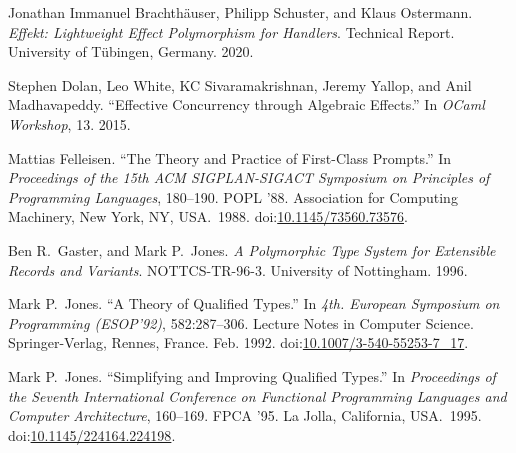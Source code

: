 \documentclass{llncs}
\begin{document}
\newpage{}%

{%
\begin{thebibliography}{20}%

\mdbibitemlabel{{}[1]}Jonathan Immanuel Brachth\"{a}user, Philipp Schuster, and Klaus Ostermann. \emph{Effekt: Lightweight Effect Polymorphism for Handlers}. Technical Report. University of T\"{u}bingen, Germany. 2020.%

\mdbibitemlabel{{}[2]}Stephen Dolan, Leo White, KC Sivaramakrishnan, Jeremy Yallop, and Anil Madhavapeddy. \textquotedblleft{}Effective Concurrency through Algebraic Effects.\textquotedblright{} In \emph{OCaml Workshop}, 13. 2015.%

\mdbibitemlabel{{}[3]}Mattias Felleisen. \textquotedblleft{}The Theory and Practice of First-Class Prompts.\textquotedblright{} In \emph{Proceedings of the 15th ACM SIGPLAN-SIGACT Symposium on Principles of Programming Languages}, 180–190. POPL ’88. Association for Computing Machinery, New York, NY, USA.~1988. doi:\href{https://dx.doi.org/10.1145/73560.73576}{10.1145/73560.73576}.%

\mdbibitemlabel{{}[4]}Ben R.~Gaster, and Mark P.~Jones. \emph{A Polymorphic Type System for Extensible Records and Variants}. NOTTCS-TR-96-3. University of Nottingham. 1996.%

\mdbibitemlabel{{}[5]}Mark P.~Jones. \textquotedblleft{}A Theory of Qualified Types.\textquotedblright{} In \emph{4th. European Symposium on Programming (ESOP’92)}, 582:287–306. Lecture Notes in Computer Science. Springer-Verlag, Rennes, France. Feb. 1992. doi:\href{https://dx.doi.org/10.1007/3-540-55253-7_17}{10.1007/3-540-55253-7\_17}.%

\mdbibitemlabel{{}[6]}Mark P.~Jones. \textquotedblleft{}Simplifying and Improving Qualified Types.\textquotedblright{} In \emph{Proceedings of the Seventh International Conference on Functional Programming Languages and Computer Architecture}, 160–169. FPCA ’95. La Jolla, California, USA.~1995. doi:\href{https://dx.doi.org/10.1145/224164.224198}{10.1145/224164.224198}.%


\end{thebibliography}}
\end{document}
